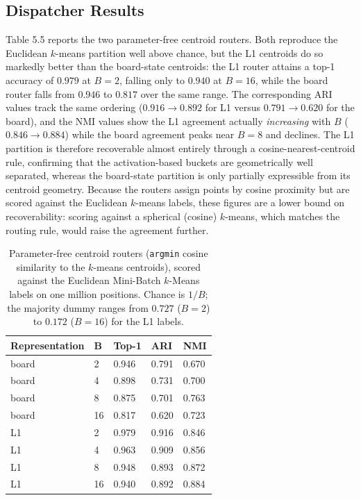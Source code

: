 \subsection{Dispatcher Results}

Table 5.5 reports the two parameter-free centroid routers. Both reproduce the Euclidean $k$-means partition well above chance, but the L1 centroids do so markedly better than the board-state centroids: the L1 router attains a top-1 accuracy of $0.979$ at $B=2$, falling only to $0.940$ at $B=16$, while the board router falls from $0.946$ to $0.817$ over the same range. The corresponding ARI values track the same ordering ($0.916 \to 0.892$ for L1 versus $0.791 \to 0.620$ for the board), and the NMI values show the L1 agreement actually \emph{increasing} with $B$ ($0.846 \to 0.884$) while the board agreement peaks near $B=8$ and declines. The L1 partition is therefore recoverable almost entirely through a cosine-nearest-centroid rule, confirming that the activation-based buckets are geometrically well separated, whereas the board-state partition is only partially expressible from its centroid geometry. Because the routers assign points by cosine proximity but are scored against the Euclidean $k$-means labels, these figures are a lower bound on recoverability: scoring against a spherical (cosine) $k$-means, which matches the routing rule, would raise the agreement further.

\begin{table}[H]
\centering
\small
\begin{tabular}{lllll}
\toprule
Representation & B & Top-1 & ARI & NMI \\
\midrule
board & 2 & 0.946 & 0.791 & 0.670 \\
board & 4 & 0.898 & 0.731 & 0.700 \\
board & 8 & 0.875 & 0.701 & 0.763 \\
board & 16 & 0.817 & 0.620 & 0.723 \\
L1 & 2 & 0.979 & 0.916 & 0.846 \\
L1 & 4 & 0.963 & 0.909 & 0.856 \\
L1 & 8 & 0.948 & 0.893 & 0.872 \\
L1 & 16 & 0.940 & 0.892 & 0.884 \\
\bottomrule
\end{tabular}
\caption{Parameter-free centroid routers (\texttt{argmin} cosine similarity to the $k$-means centroids), scored against the Euclidean Mini-Batch $k$-Means labels on one million positions. Chance is $1/B$; the majority dummy ranges from $0.727$ ($B=2$) to $0.172$ ($B=16$) for the L1 labels.}
\label{tab:5.5}
\end{table}

